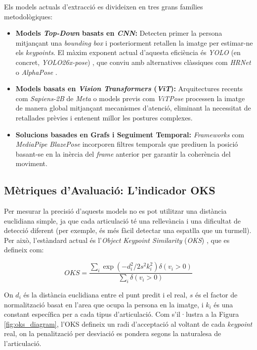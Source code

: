 \documentclass[10pt,a4paper,twocolumn,twoside]{article}
\begin{document}
Els models actuals d'extracció es divideixen en tres grans famílies metodològiques:
\begin{itemize}
    \item \textbf{Models \textit{Top-Down} basats en \textit{CNN}:} Detecten primer la persona mitjançant una \textit{bounding box} i posteriorment retallen la imatge per estimar-ne els \textit{keypoints}. El màxim exponent actual d'aquesta eficiència és \textit{YOLO} (en concret, \textit{YOLO26x-pose}) \cite{yolov8}, que conviu amb alternatives clàssiques com \textit{HRNet} \cite{hrnet} o \textit{AlphaPose} \cite{alphapose}.
    \item \textbf{Models basats en \textit{Vision Transformers} (\textit{ViT}):} Arquitectures recents com \textit{Sapiens-2B} \cite{sapiens_2024} de \textit{Meta} o models previs com \textit{ViTPose} \cite{vitpose} processen la imatge de manera global mitjançant mecanismes d'atenció, eliminant la necessitat de retallades prèvies i entenent millor les postures complexes.
    \item \textbf{Solucions basades en Grafs i Seguiment Temporal:} \textit{Frameworks} com \textit{MediaPipe BlazePose} \cite{blazepose_2020} incorporen filtres temporals que prediuen la posició basant-se en la inèrcia del \textit{frame} anterior per garantir la coherència del moviment.
\end{itemize}

\subsection{Mètriques d'Avaluació: L'indicador OKS}
Per mesurar la precisió d'aquests models no es pot utilitzar una distància euclidiana simple, ja que cada articulació té una rellevància i una dificultat de detecció diferent (per exemple, és més fàcil detectar una espatlla que un turmell). Per això, l'estàndard actual és l'\textit{Object Keypoint Similarity} (\textit{OKS}) \cite{yolo_oks}, que es defineix com:

\begin{equation}
    OKS = \frac{\sum_i \exp(-d_i^2 / 2s^2k_i^2) \delta(v_i > 0)}{\sum_i \delta(v_i > 0)}
\end{equation}

On $d_i$ és la distància euclidiana entre el punt predit i el real, $s$ és el factor de normalització basat en l'area que ocupa la persona en la imatge, i $k_i$ és una constant específica per a cada tipus d'articulació. Com s'il·lustra a la Figura \ref{fig:oks_diagram}, l'OKS defineix un radi d'acceptació al voltant de cada \textit{keypoint} real, on la penalització per desviació es pondera segons la naturalesa de l'articulació.
\end{document}
